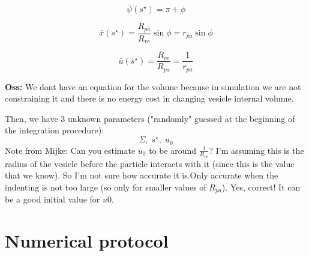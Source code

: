 \documentclass[12pt]{article}
\begin{document}
$$
\bar{\psi}(s^\star) = \pi + \phi
$$

$$
\bar{x}(s^\star) = \frac{R_{pa}}{R_{ve}} \sin \phi = r_{pa} \sin \phi
$$

$$
\bar{u}(s^\star) = \frac{R_{ve}}{R_{pa}} = \frac{1}{r_{pa}}
$$






\textbf{Oss:} We dont have an equation for the volume because in simulation we are not constraining it and there is no energy cost in changing vesicle internal volume. 


Then, we have 3 unknown parameters ("randomly" guessed at the beginning of the integration procedure):
$$\Sigma,\; s^\star ,\;u_0$$
\alert{Note from Mijke: Can you estimate $u_0$ to be around $\frac{1}{R_{ve}}$? I'm assuming this is the radius of the vesicle before the particle interacts with it (since this is the value that we know). So I'm not sure how accurate it is.Only accurate when the indenting is not too large (so only for smaller values of $R_{pa}$).} Yes, correct! It can be a good initial value for $u0$.


\section{Numerical protocol}
\end{document}
